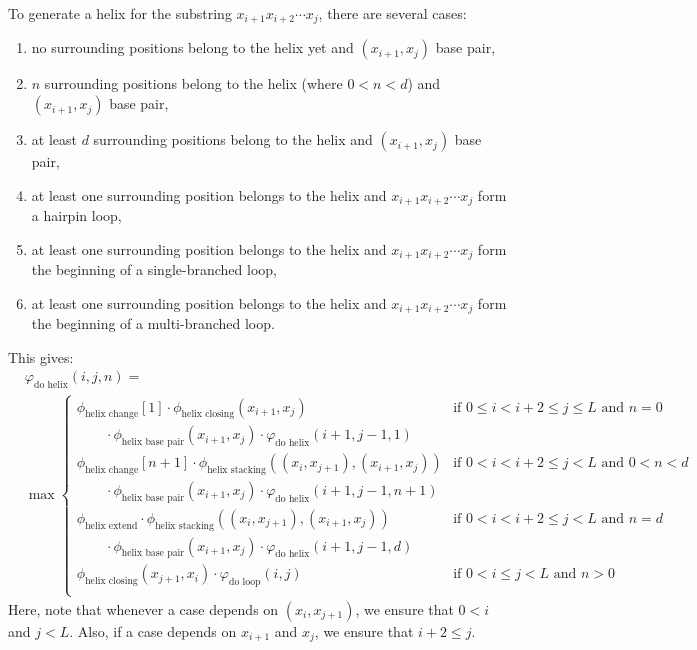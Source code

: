 \documentclass{article}
\newcommand{\helixstacking}{\phi_\text{helix stacking}}
\newcommand{\helixbasepair}{\phi_\text{helix base pair}}
\newcommand{\helixextend}{\phi_\text{helix extend}}
\newcommand{\helixclosing}{\phi_\text{helix closing}}
\newcommand{\helixchange}{\phi_\text{helix change}}
\newcommand{\doloop}{\varphi_\text{do loop}}
\newcommand{\dohelix}{\varphi_\text{do helix}}
\begin{document}
  To generate a helix for the substring $x_{i+1} x_{i+2} \cdots x_j$, there are several cases:
  \begin{enumerate}
  \item no surrounding positions belong to the helix yet and $(x_{i+1},x_j)$ base pair,
  \item $n$ surrounding positions belong to the helix (where $0 < n < d$) and $(x_{i+1},x_j)$ base pair,
  \item at least $d$ surrounding positions belong to the helix and $(x_{i+1},x_j)$ base pair,
  \item at least one surrounding position belongs to the helix and $x_{i+1} x_{i+2} \cdots x_j$ form a hairpin loop,
  \item at least one surrounding position belongs to the helix and $x_{i+1} x_{i+2} \cdots x_j$ form the beginning of a single-branched loop,
  \item at least one surrounding position belongs to the helix and $x_{i+1} x_{i+2} \cdots x_j$ form the beginning of a multi-branched loop.
  \end{enumerate}
  This gives:
  \begin{align*}
    &\dohelix(i,j,n) = \\
    &\max \begin{cases}
      \helixchange[1] \cdot \helixclosing (x_{i+1}, x_j) & \text{if $0\le i < i+2\le j \le L$ and $n=0$} \\
      \qquad{} \cdot \helixbasepair (x_{i+1}, x_j) \cdot \dohelix(i+1,j-1,1) \\
      \helixchange[n+1] \cdot \helixstacking((x_{i},x_{j+1}),(x_{i+1},x_{j})) & \text{if $0 < i < i+2\le j < L$ and $0 < n < d$} \\
      \qquad{} \cdot \helixbasepair (x_{i+1}, x_j) \cdot \dohelix(i+1,j-1,n+1) \\
      \helixextend \cdot \helixstacking((x_{i},x_{j+1}),(x_{i+1},x_{j})) & \text{if $0<i < i+2\le j<L$ and $n=d$} \\
      \qquad{} \cdot \helixbasepair (x_{i+1}, x_j) \cdot \dohelix(i+1,j-1,d) \\
      \helixclosing (x_{j+1}, x_i) \cdot \doloop(i,j) & \text{if $0<i\le j<L$ and $n>0$} \\
    \end{cases}
  \end{align*}
  Here, note that whenever a case depends on $(x_i,x_{j+1})$, we ensure that $0 < i$ and $j < L$.  Also,
  if a case depends on $x_{i+1}$ and $x_j$, we ensure that $i+2 \le j$.
\end{document}
